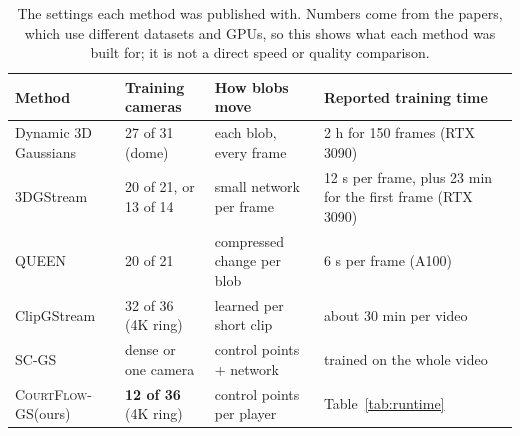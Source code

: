 \documentclass[11pt]{article}
\newcommand{\method}{\textsc{CourtFlow-GS}\xspace}
\begin{document}
\begin{table}[!htbp]\centering
\caption{The settings each method was published with. Numbers come from the papers, which use
different datasets and GPUs, so this shows what each method was built for; it is not a direct
speed or quality comparison.}\label{tab:related}
\small\begin{tabular}{p{.17\linewidth}p{.25\linewidth}p{.25\linewidth}p{.23\linewidth}}\toprule
Method & Training cameras & How blobs move & Reported training time \\\midrule
Dynamic 3D Gaussians & 27 of 31 (dome) & each blob, every frame & 2 h for 150 frames (RTX 3090) \\
3DGStream & 20 of 21, or 13 of 14 & small network per frame & 12 s per frame, plus 23 min for the first frame (RTX 3090) \\
QUEEN & 20 of 21 & compressed change per blob & 6 s per frame (A100) \\
ClipGStream & 32 of 36 (4K ring) & learned per short clip & about 30 min per video \\
SC-GS & dense or one camera & control points + network & trained on the whole video \\
\method (ours) & \textbf{12 of 36} (4K ring) & control points per player & Table~\ref{tab:runtime} \\\bottomrule
\end{tabular}\end{table}
\end{document}
